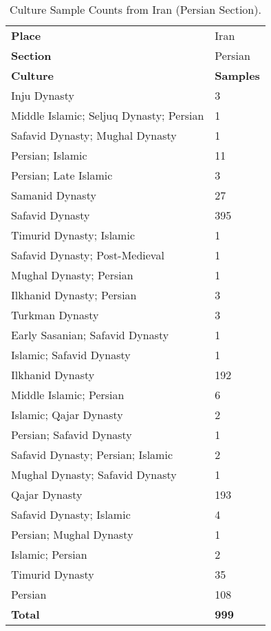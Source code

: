 \documentclass[11pt]{article}
\begin{document}
\begin{table}[ht]
    \centering
    \small
    \begin{tabularx}{\columnwidth}{Xl}
        \hline
        \rowcolor{brown!30} \textbf{Place} & Iran \\
        \rowcolor{brown!20} \textbf{Section} & Persian \\
        \hline
        \rowcolor{brown!10} \textbf{Culture} & \textbf{Samples} \\
        \hline
        Inju Dynasty & 3 \\
        Middle Islamic; Seljuq Dynasty; Persian & 1 \\
        Safavid Dynasty; Mughal Dynasty & 1 \\
        Persian; Islamic & 11 \\
        Persian; Late Islamic & 3 \\
        Samanid Dynasty & 27 \\
        Safavid Dynasty & 395 \\
        Timurid Dynasty; Islamic & 1 \\
        Safavid Dynasty; Post-Medieval & 1 \\
        Mughal Dynasty; Persian & 1 \\
        Ilkhanid Dynasty; Persian & 3 \\
        Turkman Dynasty & 3 \\
        Early Sasanian; Safavid Dynasty & 1 \\
        Islamic; Safavid Dynasty & 1 \\
        Ilkhanid Dynasty & 192 \\
        Middle Islamic; Persian & 6 \\
        Islamic; Qajar Dynasty & 2 \\
        Persian; Safavid Dynasty & 1 \\
        Safavid Dynasty; Persian; Islamic & 2 \\
        Mughal Dynasty; Safavid Dynasty & 1 \\
        Qajar Dynasty & 193 \\
        Safavid Dynasty; Islamic & 4 \\
        Persian; Mughal Dynasty & 1 \\
        Islamic; Persian & 2 \\
        Timurid Dynasty & 35 \\
        Persian & 108 \\
        \hline
        \rowcolor{brown!10}\textbf{Total} & \textbf{999} \\
        \hline
    \end{tabularx}
    \caption{Culture Sample Counts from Iran (Persian Section).}
    \label{tab:culture-sample-persian}
\end{table}
\end{document}
